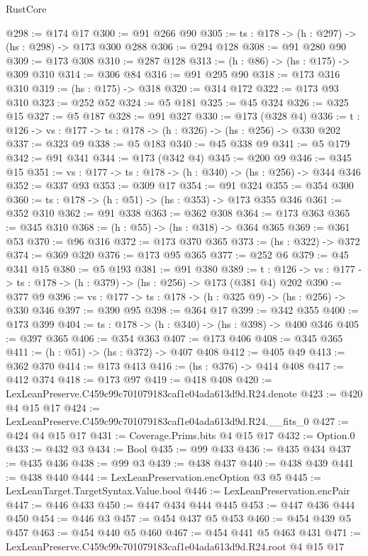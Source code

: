 \begin{lexlean}{RustCore}
\begin{coremodule}
@298 := @174 @17
@300 := @91 @266 @90
@305 := {ts : @178} -> (h : @297) -> (hs : @298) -> @173 @300 @288
@306 := @294 @128
@308 := @91 @280 @90
@309 := @173 @308
@310 := @287 @128
@313 := (h : @86) -> (hs : @175) -> @309 @310
@314 := @306 @84
@316 := @91 @295 @90
@318 := @173 @316 @310
@319 := (hs : @175) -> @318
@320 := @314 @172
@322 := @173 @93 @310
@323 := @252 @52
@324 := @5 @181
@325 := @45 @324
@326 := @325 @15
@327 := @5 @187
@328 := @91 @327
@330 := @173 (@328 @4)
@336 := {t : @126} -> {vs : @177} -> {ts : @178} -> (h : @326) -> (hs : @256) -> @330 @202
@337 := @323 @9
@338 := @5 @183
@340 := @45 @338 @9
@341 := @5 @179
@342 := @91 @341
@344 := @173 (@342 @4)
@345 := @200 @9
@346 := @345 @15
@351 := {vs : @177} -> {ts : @178} -> (h : @340) -> (hs : @256) -> @344 @346
@352 := @337 @93
@353 := @309 @17
@354 := @91 @324
@355 := @354 @300
@360 := {ts : @178} -> (h : @51) -> (hs : @353) -> @173 @355 @346
@361 := @352 @310
@362 := @91 @338
@363 := @362 @308
@364 := @173 @363
@365 := @345 @310
@368 := (h : @55) -> (hs : @318) -> @364 @365
@369 := @361 @53
@370 := @96 @316
@372 := @173 @370 @365
@373 := (hs : @322) -> @372
@374 := @369 @320
@376 := @173 @95 @365
@377 := @252 @6
@379 := @45 @341 @15
@380 := @5 @193
@381 := @91 @380
@389 := {t : @126} -> {vs : @177} -> {ts : @178} -> (h : @379) -> (hs : @256) -> @173 (@381 @4) @202
@390 := @377 @9
@396 := {vs : @177} -> {ts : @178} -> (h : @325 @9) -> (hs : @256) -> @330 @346
@397 := @390 @95
@398 := @364 @17
@399 := @342 @355
@400 := @173 @399
@404 := {ts : @178} -> (h : @340) -> (hs : @398) -> @400 @346
@405 := @397 @365
@406 := @354 @363
@407 := @173 @406
@408 := @345 @365
@411 := (h : @51) -> (hs : @372) -> @407 @408
@412 := @405 @49
@413 := @362 @370
@414 := @173 @413
@416 := (hs : @376) -> @414 @408
@417 := @412 @374
@418 := @173 @97
@419 := @418 @408
@420 := LexLeanPreserve.C459c99c701079183caf1e04ada613d9d.R24.denote
@423 := @420 @4 @15 @17
@424 := LexLeanPreserve.C459c99c701079183caf1e04ada613d9d.R24.__fits_0
@427 := @424 @4 @15 @17
@431 := Coverage.Prims.bits @4 @15 @17
@432 := Option.{0}
@433 := @432 @3
@434 := Bool
@435 := @99 @433
@436 := @435 @434
@437 := @435 @436
@438 := @99 @3
@439 := @438 @437
@440 := @438 @439
@441 := @438 @440
@444 := LexLeanPreservation.encOption @3 @5
@445 := LexLeanTarget.TargetSyntax.Value.bool
@446 := LexLeanPreservation.encPair
@447 := @446 @433
@450 := @447 @434 @444 @445
@453 := @447 @436 @444 @450
@454 := @446 @3
@457 := @454 @437 @5 @453
@460 := @454 @439 @5 @457
@463 := @454 @440 @5 @460
@467 := @454 @441 @5 @463 @431
@471 := LexLeanPreserve.C459c99c701079183caf1e04ada613d9d.R24.root @4 @15 @17

\end{coremodule}
\end{lexlean}
